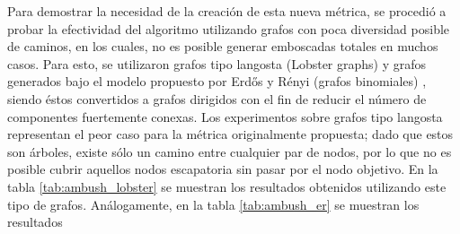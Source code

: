 Para demostrar la necesidad de la creaci\'on de esta nueva m\'etrica,
se procedi\'o a probar la efectividad del algoritmo utilizando grafos
con poca diversidad posible de caminos, en los cuales, no es posible
generar emboscadas totales en muchos casos. Para esto, se utilizaron
grafos tipo langosta (Lobster graphs) \cite{Gal09} y grafos generados
bajo el modelo propuesto por Erd\H{o}s y R{\'e}nyi (grafos binomiales)
\cite{ER59}, siendo \'estos convertidos a grafos dirigidos con el fin de
reducir el n\'umero de componentes fuertemente conexas. Los experimentos sobre
grafos tipo langosta representan el peor caso para la m\'etrica originalmente
propuesta; dado que estos son \'arboles, existe s\'olo un camino entre
cualquier par de nodos, por lo que no es posible cubrir aquellos nodos
es\-ca\-pa\-to\-ria sin pasar por el nodo objetivo. En la tabla
\ref{tab:ambush_lobster} se muestran los resultados obtenidos utilizando
este tipo de grafos.
An\'alogamente, en la tabla \ref{tab:ambush_er} se muestran los resultados
